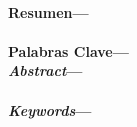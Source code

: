 \newpage
\setcounter{page}{2}
\
\vfill
\vfill
\begin{flushright}
\end{flushright}
\begin{flushright}
  \noindent \dedicatoria
\end{flushright}
\vfill
\newpage
\begin{center}
\end{center}
\noindent \agradecimientos
\vfill
\newpage
{}
\vspace{0.1cm}
\noindent \textbf{Resumen---}\resumen \ \\
\vspace{0.1cm} \\
\noindent \textbf{Palabras Clave---}\palabrasclave \ \\
\vspace{0.1cm}
\noindent \textbf{\emph{Abstract}---}\resumeningles \ \\
\vspace{0.1cm} \\
\noindent \textbf{\emph{Keywords}---}\palabrasclaveingles \
